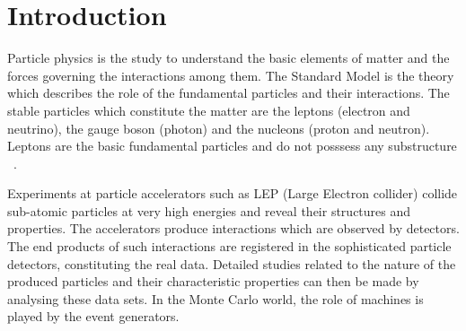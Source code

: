 \chapter{Introduction}
\label{Introduction}
Particle physics is the study to understand the basic elements of matter and the forces governing the interactions among them. The Standard Model is the theory which describes the role of the fundamental particles and their interactions. The stable particles which constitute the matter are the leptons (electron and neutrino), the gauge boson (photon) and the nucleons (proton and neutron). Leptons are the basic fundamental particles and do not posssess any substructure ~\cite{per}.

Experiments at particle accelerators such as LEP (Large Electron collider) collide sub-atomic particles at very high energies and reveal their structures and properties. The accelerators produce interactions which are 
observed by detectors. The end products of such interactions are registered in the sophisticated particle detectors, constituting the real data. Detailed studies related to the nature of the produced particles and their characteristic properties can then be made by analysing these data sets. In the Monte Carlo world, the role of machines is played by the event generators. 

